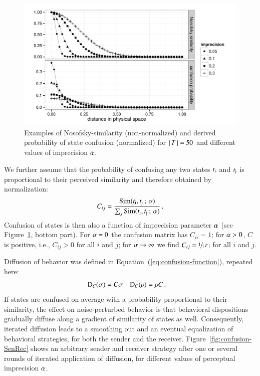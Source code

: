 \begin{figure}
  \centering

  \includegraphics[width=\textwidth]{plots/NosofskySimConf.pdf}

  \caption{Examples of Nosofsky-similarity (non-normalized) and
    derived probability of state confusion (normalized) for
    $\left \lvert \, T \, \right\rvert = 50$ and different
    values of imprecision $\alpha$.}
  \label{fig:NosofskySim}
\end{figure}





We further assume that the probability of confusing any two states
$t_{\mathrm{i}}$ and $t_{\mathrm{j}}$ is proportional to their perceived
similarity and therefore obtained by normalization:
\begin{align*}
  C_{ij} = \frac{\mathrm{Sim}(t_{\mathrm{i}}, t_{\mathrm{j}} \thinspace ; \thinspace
  \alpha)} {\sum_j \mathrm{Sim}(t_{\mathrm{i}}, t_{\mathrm{j}} \thinspace ; \thinspace
  \alpha)} \,.
\end{align*}
Confusion of states is then also a function of imprecision parameter
$\alpha$ (see Figure~\ref{fig:NosofskySim}, bottom part). For $\alpha
= 0$ the confusion matrix has $C_{ii} = 1$; for $\alpha > 0$, $C$ is
positive, i.e., $C_{ij} >0$ for all $i$ and $j$; for $\alpha
\rightarrow \infty$ we find $C_{ij} = \nicefrac{1}{\left \lvert \, T \, \right\rvert}$ for all
$i$ and $j$.

Diffusion of behavior was defined in
Equation~(\ref{eq:confusion-function}), repeated here:
\begin{align*}
  \mathrm{D}_C(\sigma) & = C \sigma &    \mathrm{D}_C(\rho) & = \rho C\,.
\end{align*}
If states are confused on average with a probability proportional to
their similarity, the effect on noise-perturbed behavior is that
behavioral dispositions gradually diffuse along a gradient of
similarity of states as well. Consequently, iterated diffusion leads
to a smoothing out and an eventual equalization of behavioral
strategies, for both the sender and the
receiver. Figure~\ref{fig:confusion-SenRec} shows an arbitrary sender
and receiver strategy after one or several rounds of iterated
application of diffusion, for different values of perceptual
imprecision $\alpha$.

